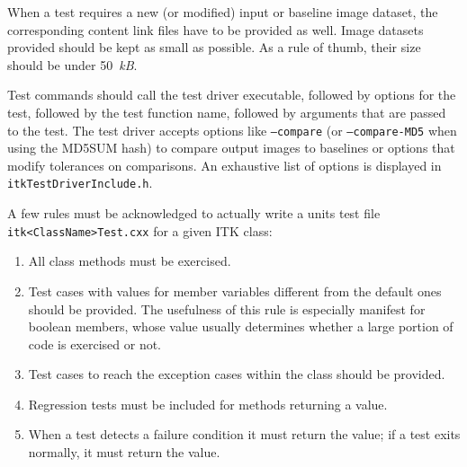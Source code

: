 When a test requires a new (or modified) input or baseline image dataset,
the corresponding content link files have to be provided as well. Image
datasets provided should be kept as small as possible. As a rule of thumb,
their size should be under 50~\textit{kB}.

Test commands should call the test driver executable, followed by options for
the test, followed by the test function name, followed by arguments that are
passed to the test. The test driver accepts options like \texttt{--compare}
(or \texttt{--compare-MD5} when using the MD5SUM hash) to compare output images
to baselines or options that modify tolerances on comparisons. An exhaustive
list of options is displayed in \texttt{itkTestDriverInclude.h}.

A few rules must be acknowledged to actually write a units test file
\texttt{itk<ClassName>Test.cxx} for a given ITK class:
\begin{enumerate}
\item All class methods must be exercised.
\item Test cases with values for member variables different from the default
ones should be provided. The usefulness of this rule is especially manifest
for boolean members, whose value usually determines whether a large portion
of code is exercised or not.
\item Test cases to reach the exception cases within the class should be
provided.
\item Regression tests must be included for methods returning a value.
\item When a test detects a failure condition it must return the
 value; if a test exits normally, it must return
the  value.
\end{enumerate}

